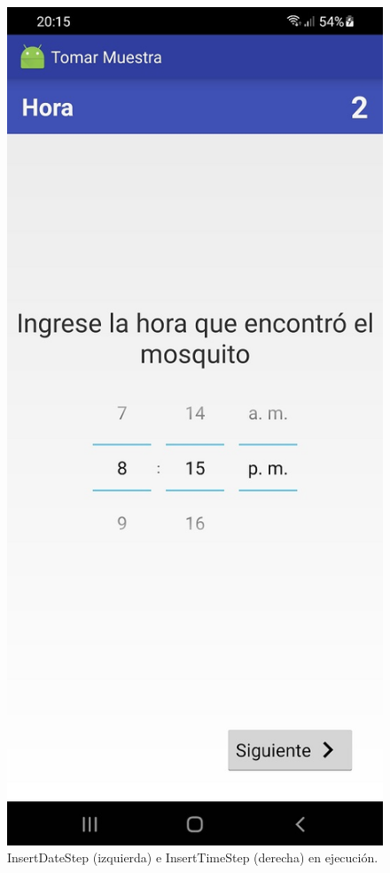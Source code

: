 \begin{figure}[H]
    \includegraphics[scale=0.3]{50-anexos/C-steps/insert_time_screen.jpg} 
    \caption{InsertDateStep (izquierda) e InsertTimeStep (derecha) en ejecución.}
\end{figure}


